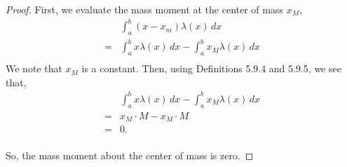 \documentclass[../hw7.tex]{subfiles}
\begin{document}
\begin{proof}

First, we evaluate the mass moment at the center of mass $x_M$,
\begin{align*}
    &\int_{a}^{b} (x-x_m)\lambda(x)\,dx \\
    =& \int_{a}^{b}x\lambda(x)\,dx - \int_{a}^{b}x_M\lambda(x)\,dx \\
\end{align*}
We note that $x_M$ is a constant. Then, using Definitions 5.9.4 and 5.9.5, we see that,
\begin{align*}
    & \int_{a}^{b}x\lambda(x)\,dx - \int_{a}^{b}x_M\lambda(x)\,dx \\
    =& x_M\cdot M - x_M\cdot M \\
    =&0. \\
\end{align*}

So, the mass moment about the center of mass is zero.








\end{proof}
\end{document}
